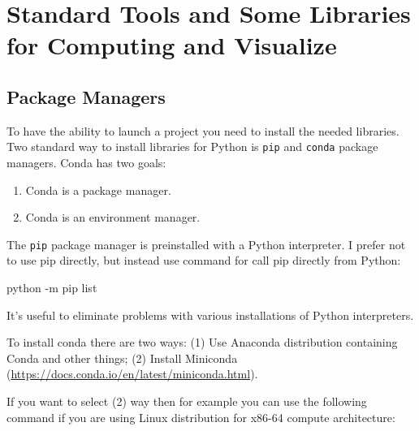 \documentclass[
]{article}
\newenvironment{Shaded}{}{}
\newcommand{\AttributeTok}[1]{\textcolor[rgb]{0.49,0.56,0.16}{#1}}
\newcommand{\BuiltInTok}[1]{#1}
\newcommand{\ExtensionTok}[1]{#1}
\newcommand{\FunctionTok}[1]{\textcolor[rgb]{0.02,0.16,0.49}{#1}}
\newcommand{\KeywordTok}[1]{\textcolor[rgb]{0.00,0.44,0.13}{\textbf{#1}}}
\newcommand{\NormalTok}[1]{#1}
\newcommand{\OperatorTok}[1]{\textcolor[rgb]{0.40,0.40,0.40}{#1}}
\newcommand{\StringTok}[1]{\textcolor[rgb]{0.25,0.44,0.63}{#1}}
\newcommand{\VariableTok}[1]{\textcolor[rgb]{0.10,0.09,0.49}{#1}}
\begin{document}
\hypertarget{standard-tools-and-some-libraries-for-computing-and-visualize}{%
\section{Standard Tools and Some Libraries for Computing and
Visualize}\label{standard-tools-and-some-libraries-for-computing-and-visualize}}

\hypertarget{package-managers}{%
\subsection{Package Managers}\label{package-managers}}

To have the ability to launch a project you need to install the needed
libraries. Two standard way to install libraries for Python is
\texttt{pip} and \texttt{conda} package managers. Conda has two goals:

\begin{enumerate}
\def\labelenumi{\arabic{enumi}.}
\item
  Conda is a package manager.
\item
  Conda is an environment manager.
\end{enumerate}

The \texttt{pip} package manager is preinstalled with a Python
interpreter. I prefer not to use pip directly, but instead use command
for call pip directly from Python:

\begin{Shaded}
\begin{Highlighting}[]
\NormalTok{python }\OperatorTok{{-}}\NormalTok{m pip }\BuiltInTok{list}
\end{Highlighting}
\end{Shaded}

It's useful to eliminate problems with various installations of Python
interpreters.

To install conda there are two ways: (1) Use Anaconda distribution
containing Conda and other things; (2) Install Miniconda
(\url{https://docs.conda.io/en/latest/miniconda.html}).

If you want to select (2) way then for example you can use the following
command if you are using Linux distribution for x86-64 compute
architecture:

\begin{Shaded}
\end{Shaded}
\end{document}
